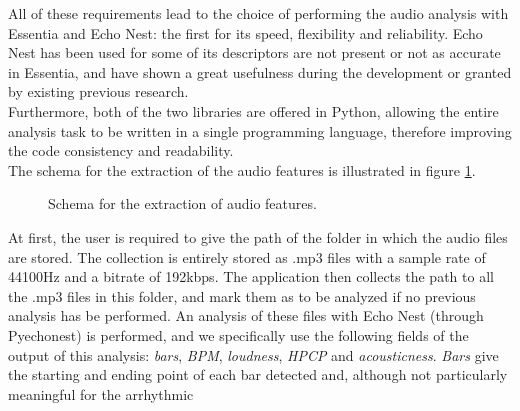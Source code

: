 All of these requirements lead to the choice of performing the audio analysis with Essentia and Echo Nest: the first for its speed, flexibility and reliability. Echo Nest has been used for some of its descriptors are not present or not as accurate in Essentia, and have shown a great usefulness during the development or granted by existing previous research. \\ Furthermore, both of the two libraries are offered in Python, allowing the entire analysis task to be written in a single programming language, therefore improving the code consistency and readability. \\
The schema for the extraction of the audio features is illustrated in figure \ref{fig:extraction}. \\ 
\begin{figure}[h]\hskip -1cm
\caption{Schema for the extraction of audio features.}
\label{fig:extraction}
\end{figure}
At first, the user is required to give the path of the folder in which the audio files are stored. The collection is entirely stored as .mp3 files with a sample rate of 44100Hz and a bitrate of 192kbps. The application then collects the path to all the .mp3 files in this folder, and mark them as to be analyzed if no previous analysis has be performed. An analysis of these files with Echo Nest (through Pyechonest) is performed, and we specifically use the following fields of the output of this analysis: \textit{bars}, \textit{BPM}, \textit{loudness}, \textit{HPCP} and \textit{acousticness}. \textit{Bars} give the starting and ending point of each bar detected and, although not particularly meaningful for the arrhythmic
